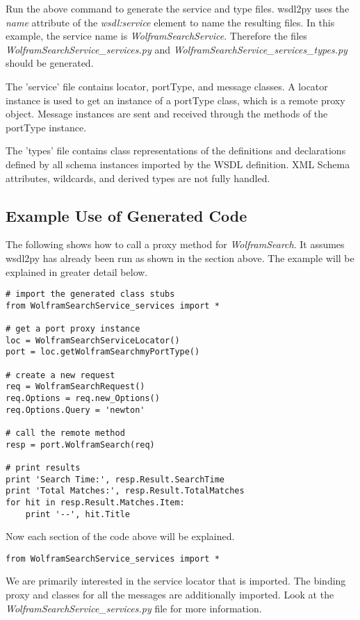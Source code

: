 Run the above command to generate the service and type files.  wsdl2py uses
the {\it name} attribute of the {\it wsdl:service} element to name the resulting files.
In this example, the service name is {\it WolframSearchService}.  Therefore the files
{\it WolframSearchService_services.py} and {\it WolframSearchService_services_types.py}
should be generated.

The 'service' file contains locator, portType, and message classes.  
A locator instance is used to get an instance of a portType class, 
which is a remote proxy object. Message instances are sent and received 
through the methods of the portType instance.

The 'types' file contains class representations of the definitions and
declarations defined by all schema instances imported by the WSDL definition.
XML Schema attributes, wildcards, and derived types are not fully
handled.

\subsection{Example Use of Generated Code}

The following shows how to call a proxy method for {\it WolframSearch}.  It
assumes wsdl2py has already been run as shown in the section above.  The example
will be explained in greater detail below.

\begin{verbatim}
# import the generated class stubs
from WolframSearchService_services import *

# get a port proxy instance
loc = WolframSearchServiceLocator()
port = loc.getWolframSearchmyPortType()

# create a new request
req = WolframSearchRequest()
req.Options = req.new_Options()
req.Options.Query = 'newton'

# call the remote method
resp = port.WolframSearch(req)

# print results
print 'Search Time:', resp.Result.SearchTime
print 'Total Matches:', resp.Result.TotalMatches
for hit in resp.Result.Matches.Item:
    print '--', hit.Title
\end{verbatim}

Now each section of the code above will be explained.

\begin{verbatim}
from WolframSearchService_services import *
\end{verbatim}

We are primarily interested in the service locator that is imported.  The 
binding proxy and classes for all the messages are additionally imported.
Look at the {\it WolframSearchService_services.py} file for more information.

